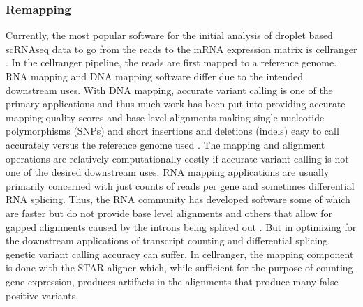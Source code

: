\subsubsection{Remapping}
\par{
Currently, the most popular software for the initial analysis of droplet based scRNAseq data to go from the reads to the mRNA expression matrix is cellranger \cite{10xsinglecell}. In the cellranger pipeline, the reads are first mapped to a reference genome. RNA mapping and DNA mapping software differ due to the intended downstream uses. With DNA mapping, accurate variant calling is one of the primary applications and thus much work has been put into providing accurate mapping quality scores and base level alignments making single nucleotide polymorphisms (SNPs) and short insertions and deletions (indels) easy to call accurately versus the reference genome used \cite{bwa}\cite{minimap2}\cite{bowtie}\cite{freebayes}\cite{gatk}. The mapping and alignment operations are relatively computationally costly if accurate variant calling is not one of the desired downstream uses. RNA mapping applications are usually primarily concerned with just counts of reads per gene and sometimes differential RNA splicing. Thus, the RNA community has developed software some of which are faster but do not provide base level alignments \cite{kallisto}\cite{salmon} and others that allow for gapped alignments caused by the introns being spliced out \cite{bowtie2}\cite{STAR}\cite{hisat}\cite{tophat}. But in optimizing for the downstream applications of transcript counting and differential splicing, genetic variant calling accuracy can suffer. In cellranger, the mapping component is done with the STAR aligner \cite{STAR} which, while sufficient for the purpose 
of counting gene expression, produces artifacts in the alignments that produce many false positive variants. 
}
